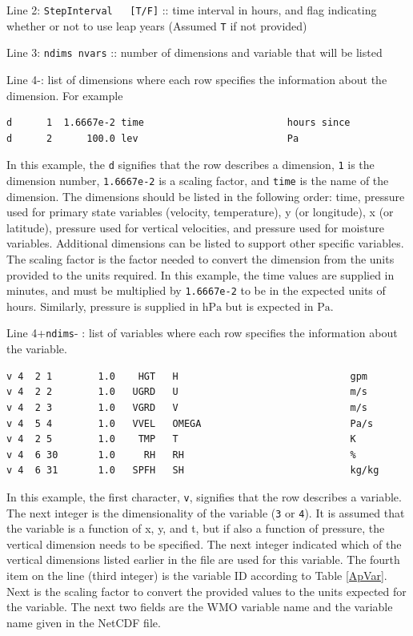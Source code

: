 \documentclass[11pt]{article}   %
\begin{document}
Line 2: \verb|StepInterval   [T/F]| :: time interval in hours, and flag indicating
whether or not to use leap years (Assumed \verb|T| if not provided)

Line 3: \verb|ndims nvars| :: number of dimensions and variable that will be listed

Line 4-: list of dimensions where each row specifies the information about the dimension.
For example
\small
\begin{verbatim}
d      1  1.6667e-2 time                         hours since
d      2      100.0 lev                          Pa
\end{verbatim}
\normalsize
In this example, the \verb|d| signifies that the row describes a dimension, \verb|1| is
the dimension number, \verb|1.6667e-2| is a scaling factor, and
\verb|time| is the name of the dimension.  The dimensions should be listed in the
following order: time, pressure used for primary state variables (velocity, temperature),
y (or longitude), x (or latitude), pressure used for vertical velocities, and pressure
used for moisture variables.  Additional dimensions can be listed to support other
specific variables.  The scaling factor is the factor needed to convert the dimension
from the units provided to the units required.  In this example, the time values are
supplied in minutes, and must be multiplied by \verb|1.6667e-2| to be in the expected
units of hours.  Similarly, pressure is supplied in $\mathrm{hPa}$ but is expected in
$\mathrm{Pa}$.  

Line 4+\verb|ndims|- : list of variables where each row specifies the information about
the variable.
\small
\begin{verbatim}
v 4  2 1        1.0    HGT   H                              gpm
v 4  2 2        1.0   UGRD   U                              m/s
v 4  2 3        1.0   VGRD   V                              m/s
v 4  5 4        1.0   VVEL   OMEGA                          Pa/s
v 4  2 5        1.0    TMP   T                              K
v 4  6 30       1.0     RH   RH                             %
v 4  6 31       1.0   SPFH   SH                             kg/kg
\end{verbatim}
\normalsize
In this example, the first character, \verb|v|, signifies that the row describes a variable.
The next integer is the dimensionality of the variable (\verb|3| or \verb|4|).
It is assumed that the variable
is a function of x, y, and t, but if also a function of pressure, the vertical dimension
needs to be specified.  The next integer indicated which of the vertical dimensions listed
earlier in the file are used for this variable.  The fourth item on the line (third integer)
is the variable ID according to Table \ref{ApVar}.  Next is the scaling factor to convert
the provided values to the units expected for the variable.  The next two fields are the
WMO variable name and the variable name given in the NetCDF file.
\end{document}
